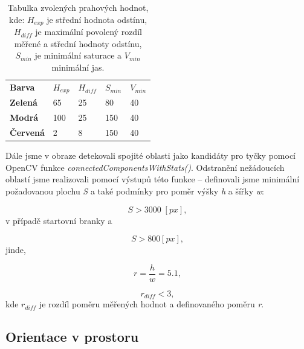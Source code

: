 \documentclass{article}
\begin{document}
\begin{table}[h]
\centering
\begin{tabular}{|p{15mm}|p{15mm}|p{15mm}|p{15mm}|p{15mm}|}
\hline
\bf{Barva} & \bf{$H_{exp}$} & \bf{$H_{diff}$} & \bf{$S_{min}$} & \bf{$V_{min}$}\\
\hhline{|=|=|=|=|=|}
\bf{Zelená} & 65 & 25 & 80 & 40 \\
\hline
\bf{Modrá} & 100 & 25 & 150 & 40 \\
\hline
\bf{Červená} & 2 & 8 & 150 & 40 \\
\hline


\end{tabular}

\caption{Tabulka zvolených prahových hodnot, kde: $H_{exp}$ je střední hodnota odstínu, $H_{diff}$ je maximální povolený rozdíl měřené a střední hodnoty odstínu, $S_{min}$ je minimální saturace a $V_{min}$ minimální jas.}

\end{table}

\vspace{0.7cm}

	Dále jsme v obraze detekovali spojité oblasti jako kandidáty pro tyčky pomocí OpenCV funkce {\it connectedComponentsWithStats()}. Odstranění nežádoucích oblastí jsme realizovali pomocí výstupů této funkce -- definovali jsme minimální požadovanou plochu {\it S} a také podmínky pro poměr výšky {\it h} a šířky {\it w}:
	
\begin{equation}
	S > 3000 \; [px],
\end{equation}
 	v případě startovní branky a 

\begin{equation}
	S > 800 [px],
\end{equation}
jinde,

\begin{equation}
	r = \frac{h}{w} = 5.1,
\end{equation}

\begin{equation}
	r_{diff} < 3,
\end{equation}
	kde $r_{diff}$ je rozdíl poměru měřených hodnot a definovaného poměru {\it r}. 

\subsection{Orientace v prostoru}
\end{document}
